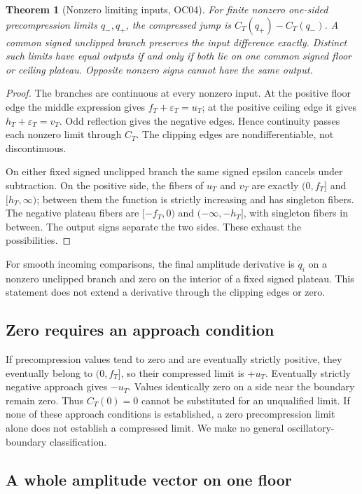 \documentclass[11pt,a4paper]{article}
\newtheorem{theorem}{Theorem}[section]
\theoremstyle{remark}\newtheorem{remark}[theorem]{Remark}
\numberwithin{equation}{section}
\begin{document}
\begin{theorem}[Nonzero limiting inputs, OC04]\label{thm:compression}
For finite nonzero one-sided precompression limits $q_-,q_+$, the compressed
jump is $C_T(q_+)-C_T(q_-)$. A common signed unclipped branch preserves the
input difference exactly. Distinct such limits have equal outputs if and
only if both lie on one common signed floor or ceiling plateau.
Opposite nonzero signs cannot have the same output.
\end{theorem}
\begin{proof}
The branches are continuous at every nonzero input. At the positive floor
edge the middle expression gives $f_T+\varepsilon_T=u_T$; at the positive
ceiling edge it gives $h_T+\varepsilon_T=v_T$. Odd reflection gives the
negative edges. Hence continuity passes each nonzero limit through $C_T$.
The clipping edges are nondifferentiable, not discontinuous.

On either fixed signed unclipped branch the same signed epsilon cancels
under subtraction. On the positive side, the fibers of $u_T$ and $v_T$
are exactly $(0,f_T]$ and $[h_T,\infty)$; between them the function is
strictly increasing and has singleton fibers. The negative plateau fibers
are $[-f_T,0)$ and $(-\infty,-h_T]$, with singleton fibers in between.
The output signs separate the two sides. These exhaust the possibilities.
\end{proof}

For smooth incoming comparisons, the final amplitude derivative is
$\dot q_i$ on a nonzero unclipped branch and zero on the interior of a
fixed signed plateau. This statement does not extend a derivative through
the clipping edges or zero.

\subsection{Zero requires an approach condition}

If precompression values tend to zero and are eventually strictly positive,
they eventually belong to $(0,f_T]$, so their compressed limit is $+u_T$.
Eventually strictly negative approach gives $-u_T$. Values identically
zero on a side near the boundary remain zero.
Thus $C_T(0)=0$ cannot be substituted for an unqualified limit.
If none of these approach conditions is established, a zero precompression
limit alone does not establish a compressed limit. We make no general
oscillatory-boundary classification.

\subsection{A whole amplitude vector on one floor}\label{sec:erasure}
\end{document}
